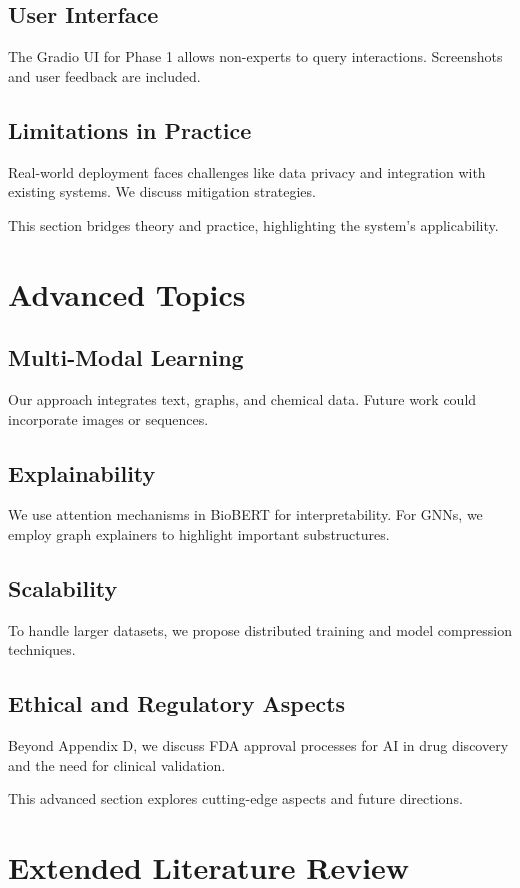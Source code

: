 \documentclass[12pt,a4paper]{article}
\begin{document}
\subsection{User Interface}
The Gradio UI for Phase 1 allows non-experts to query interactions. Screenshots and user feedback are included.

\subsection{Limitations in Practice}
Real-world deployment faces challenges like data privacy and integration with existing systems. We discuss mitigation strategies.

This section bridges theory and practice, highlighting the system's applicability.

\section{Advanced Topics}
\label{sec:advanced}

\subsection{Multi-Modal Learning}
Our approach integrates text, graphs, and chemical data. Future work could incorporate images or sequences.

\subsection{Explainability}
We use attention mechanisms in BioBERT for interpretability. For GNNs, we employ graph explainers to highlight important substructures.

\subsection{Scalability}
To handle larger datasets, we propose distributed training and model compression techniques.

\subsection{Ethical and Regulatory Aspects}
Beyond Appendix D, we discuss FDA approval processes for AI in drug discovery and the need for clinical validation.

This advanced section explores cutting-edge aspects and future directions.

\section{Extended Literature Review}
\label{sec:ext_lit}
\end{document}
